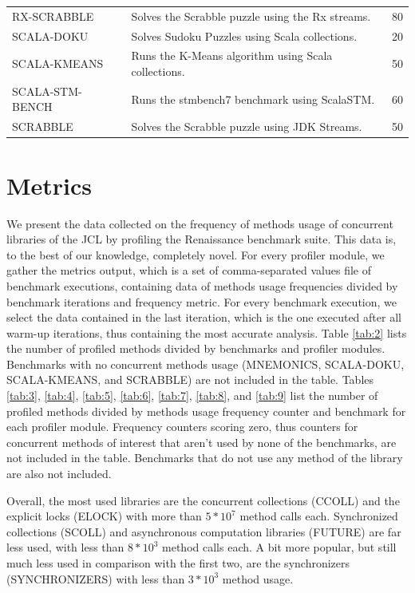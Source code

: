 \documentclass[]{usiinfthesis}
\begin{document}
\begin{table}
\begin{tabularx}{\textwidth}{|l|X|c|}
RX-SCRABBLE	&Solves the Scrabble puzzle using the Rx streams.	&80	\\
SCALA-DOKU	&Solves Sudoku Puzzles using Scala collections.	&20	\\
SCALA-KMEANS	&Runs the K-Means algorithm using Scala collections. 	&50	\\
SCALA-STM-BENCH	&Runs the stmbench7 benchmark using ScalaSTM.	&60	\\
SCRABBLE	&Solves the Scrabble puzzle using JDK Streams.	&50	\\
\hline
\end{tabularx}
\end{table}%

\section{Metrics} \label{sec:6.2}
We present the data collected on the frequency of methods usage of concurrent libraries of the JCL by profiling the Renaissance benchmark suite. This data is, to the best of our knowledge, completely novel. For every profiler module, we gather the metrics output, which is a set of comma-separated values file of benchmark executions, containing data of methods usage frequencies divided by benchmark iterations and frequency metric. For every benchmark execution, we select the data contained in the last iteration, which is the one executed after all warm-up iterations, thus containing the most accurate analysis. Table \ref{tab:2} lists the number of profiled methods divided by benchmarks and profiler modules. Benchmarks with no concurrent methods usage (MNEMONICS, SCALA-DOKU, SCALA-KMEANS, and SCRABBLE) are not included in the table. Tables \ref{tab:3}, \ref{tab:4}, \ref{tab:5}, \ref{tab:6}, \ref{tab:7}, \ref{tab:8}, and \ref{tab:9} list the number of profiled methods divided by methods usage frequency counter and benchmark for each profiler module. Frequency counters scoring zero, thus counters for concurrent methods of interest that aren't used by none of the benchmarks, are not included in the table. Benchmarks that do not use any method of the library are also not included. 

Overall, the most used libraries are the concurrent collections (CCOLL) and the explicit locks (ELOCK) with more than \(5*10^7\) method calls each. Synchronized collections (SCOLL) and asynchronous computation libraries (FUTURE) are far less used, with less than \(8*10^3\) method calls each. A bit more popular, but still much less used in comparison with the first two, are the synchronizers (SYNCHRONIZERS) with less than \(3*10^3\) method usage.
\end{document}
